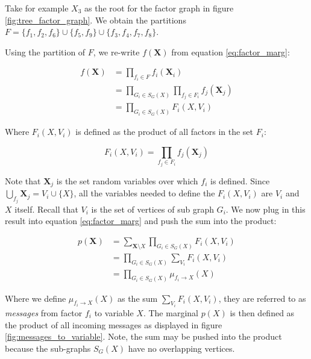 \begin{exmp}
Take for example $X_3$ as the root for the factor graph in
figure \ref{fig:tree_factor_graph}. We obtain the partitions
$F = \{f_1, f_2, f_6\} \cup \{f_5, f_9\} \cup \{f_3, f_4, f_7, f_8\}$.
\end{exmp}

\noindent
Using the partition of $F$, we re-write $f(\textbf{X})$ from equation
\ref{eq:factor_marg}:

\begin{equation}\begin{split}
f(\textbf{X}) 
	&= \prod_{f_i \in F} f_i(\textbf{X}_i) \\
	&= \prod_{G_i \in S_G(X)}\prod_{f_j \in F_i} f_j(\textbf{X}_j)\\
	&= \prod_{G_i \in S_G(X)}F_i(X, V_i)
\end{split}\end{equation}

\noindent
Where $F_i(X, V_i)$ is defined as the product of
all factors in the set $F_i$:

\begin{equation}
\label{eq:Fdef}
F_i(X, V_i) = \prod_{f_j \in F_i} f_j(\textbf{X}_j)
\end{equation} 

\noindent
Note that $\textbf{X}_j$ is the set random variables over which
$f_i$ is defined. Since $\bigcup_{f_j} \textbf{X}_j = V_i \cup \{X\}$,
all the variables needed to define the $F_i(X, V_i)$ are 
$V_i$ and $X$ itself.
Recall that $V_i$ is the set of vertices
of sub graph $G_i$. We now plug in this result into equation
\ref{eq:factor_marg} and push the sum into the product:

\begin{equation}\label{eq:mudef}\begin{split}
p(\textbf{X}) 
	&= \sum_{\textbf{X}\setminus X} \prod_{G_i \in S_G(X)} F_i(X, V_i) \\
	&= \prod_{G_i \in S_G(X)} \sum_{V_i} F_i(X, V_i) \\
	&= \prod_{G_i \in S_G(X)} \mu_{f_i \rightarrow X}(X)
\end{split}\end{equation}

\noindent
Where we define $\mu_{f_i \rightarrow X}(X)$ as the sum
$\sum_{V_i} F_i(X, V_i)$, they are referred to as \textit{messages}
from factor $f_i$ to variable $X$. The marginal $p(X)$ is then
defined as the product of all incoming messages as displayed
in figure \ref{fig:messages_to_variable}.
Note, the sum may be pushed into the product
because the sub-graphs $S_G(X)$ have no overlapping vertices.


